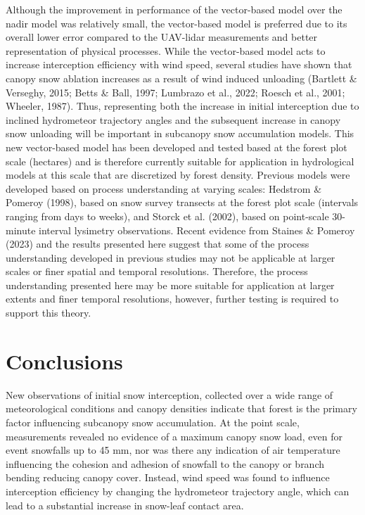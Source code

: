 \documentclass[
  letterpaper,
  DIV=11,
  numbers=noendperiod]{scrartcl}
\begin{document}
Although the improvement in performance of the vector-based model over
the nadir model was relatively small, the vector-based model is
preferred due to its overall lower error compared to the UAV-lidar
measurements and better representation of physical processes. While the
vector-based model acts to increase interception efficiency with wind
speed, several studies have shown that canopy snow ablation increases as
a result of wind induced unloading (Bartlett \& Verseghy, 2015; Betts \&
Ball, 1997; Lumbrazo et al., 2022; Roesch et al., 2001; Wheeler, 1987).
Thus, representing both the increase in initial interception due to
inclined hydrometeor trajectory angles and the subsequent increase in
canopy snow unloading will be important in subcanopy snow accumulation
models. This new vector-based model has been developed and tested based
at the forest plot scale (hectares) and is therefore currently suitable
for application in hydrological models at this scale that are
discretized by forest density. Previous models were developed based on
process understanding at varying scales: Hedstrom \& Pomeroy (1998),
based on snow survey transects at the forest plot scale (intervals
ranging from days to weeks), and Storck et al. (2002), based on
point-scale 30-minute interval lysimetry observations. Recent evidence
from Staines \& Pomeroy (2023) and the results presented here suggest
that some of the process understanding developed in previous studies may
not be applicable at larger scales or finer spatial and temporal
resolutions. Therefore, the process understanding presented here may be
more suitable for application at larger extents and finer temporal
resolutions, however, further testing is required to support this
theory.

\section{Conclusions}\label{conclusions}

New observations of initial snow interception, collected over a wide
range of meteorological conditions and canopy densities indicate that
forest is the primary factor influencing subcanopy snow accumulation. At
the point scale, measurements revealed no evidence of a maximum canopy
snow load, even for event snowfalls up to 45 mm, nor was there any
indication of air temperature influencing the cohesion and adhesion of
snowfall to the canopy or branch bending reducing canopy cover. Instead,
wind speed was found to influence interception efficiency by changing
the hydrometeor trajectory angle, which can lead to a substantial
increase in snow-leaf contact area.
\end{document}
